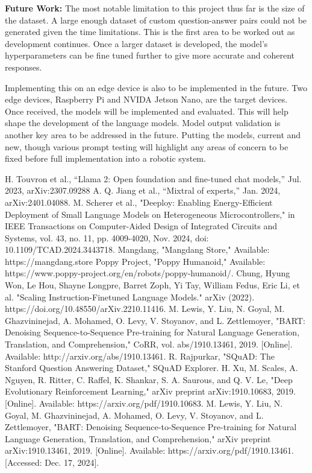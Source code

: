 \documentclass[conference]{IEEEtran}
\begin{document}
\noindent
\textbf{Future Work:}
The most notable limitation to this project thus far is the size of the dataset. 
A large enough dataset of custom question-answer pairs could not be generated given the time limitations.
This is the first area to be worked out as development continues.
Once a larger dataset is developed, the model's hyperparameters can be fine tuned further to give more accurate and coherent responses.

Implementing this on an edge device is also to be implemented in the future. Two edge devices, Raspberry Pi and NVIDA Jetson Nano, are the target devices.
Once received, the models will be implemented and evaluated. This will help shape the development of the language models. 
Model output validation is another key area to be addressed in the future. Putting the models, current and new, though various prompt testing will highlight any areas of concern to be fixed before full implementation into a robotic system.

\begin{thebibliography}{00}
 H. Touvron et al., “Llama 2: Open foundation and fine-tuned chat models,” Jul. 2023, arXiv:2307.09288
 A. Q. Jiang et al., “Mixtral of experts,” Jan. 2024, arXiv:2401.04088.
 M. Scherer et al., "Deeploy: Enabling Energy-Efficient Deployment of Small Language Models on Heterogeneous Microcontrollers," in IEEE Transactions on Computer-Aided Design of Integrated Circuits and Systems, vol. 43, no. 11, pp. 4009-4020, Nov. 2024, doi: 10.1109/TCAD.2024.3443718.
 Mangdang, "Mangdang Store," Available: https://mangdang.store
 Poppy Project, "Poppy Humanoid," Available: https://www.poppy-project.org/en/robots/poppy-humanoid/.
 Chung, Hyung Won, Le Hou, Shayne Longpre, Barret Zoph, Yi Tay, William Fedus, Eric Li, et al. "Scaling Instruction-Finetuned Language Models." arXiv (2022). https://doi.org/10.48550/arXiv.2210.11416.
 M. Lewis, Y. Liu, N. Goyal, M. Ghazvininejad, A. Mohamed, O. Levy, V. Stoyanov, and L. Zettlemoyer, "BART: Denoising Sequence-to-Sequence Pre-training for Natural Language Generation, Translation, and Comprehension," CoRR, vol. abs/1910.13461, 2019. [Online]. Available: http://arxiv.org/abs/1910.13461.
 R. Rajpurkar, "SQuAD: The Stanford Question Answering Dataset," SQuAD Explorer.
 H. Xu, M. Scales, A. Nguyen, R. Ritter, C. Raffel, K. Shankar, S. A. Saurous, and Q. V. Le, "Deep Evolutionary Reinforcement Learning," arXiv preprint arXiv:1910.10683, 2019. [Online]. Available: https://arxiv.org/pdf/1910.10683.
 M. Lewis, Y. Liu, N. Goyal, M. Ghazvininejad, A. Mohamed, O. Levy, V. Stoyanov, and L. Zettlemoyer, "BART: Denoising Sequence-to-Sequence Pre-training for Natural Language Generation, Translation, and Comprehension," arXiv preprint arXiv:1910.13461, 2019. [Online]. Available: https://arxiv.org/pdf/1910.13461. [Accessed: Dec. 17, 2024].
\end{thebibliography}
\end{document}
